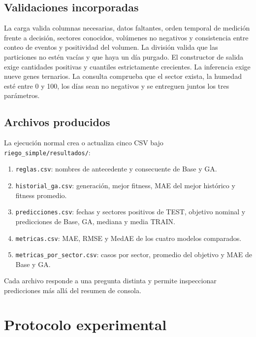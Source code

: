 \documentclass[11pt,letterpaper]{article}
\newcommand{\codigo}[1]{\texttt{\small #1}}
\begin{document}
\subsection{Validaciones incorporadas}
La carga valida columnas necesarias, datos faltantes, orden temporal de medición frente a decisión, sectores conocidos, volúmenes no negativos y consistencia entre conteo de eventos y positividad del volumen. La división valida que las particiones no estén vacías y que haya un día purgado. El constructor de salida exige cantidades positivas y cuantiles estrictamente crecientes. La inferencia exige nueve genes ternarios. La consulta comprueba que el sector exista, la humedad esté entre 0 y 100, los días sean no negativos y se entreguen juntos los tres parámetros.

\subsection{Archivos producidos}
La ejecución normal crea o actualiza cinco CSV bajo \codigo{riego\_simple/resultados/}:
\begin{enumerate}
  \item \codigo{reglas.csv}: nombres de antecedente y consecuente de Base y GA.
  \item \codigo{historial\_ga.csv}: generación, mejor fitness, MAE del mejor histórico y fitness promedio.
  \item \codigo{predicciones.csv}: fechas y sectores positivos de TEST, objetivo nominal y predicciones de Base, GA, mediana y media TRAIN.
  \item \codigo{metricas.csv}: MAE, RMSE y MedAE de los cuatro modelos comparados.
  \item \codigo{metricas\_por\_sector.csv}: casos por sector, promedio del objetivo y MAE de Base y GA.
\end{enumerate}
Cada archivo responde a una pregunta distinta y permite inspeccionar predicciones más allá del resumen de consola.

\section{Protocolo experimental}
\end{document}
